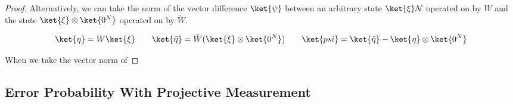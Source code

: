 \begin{proof}

Alternatively, we can take the norm of the vector difference $\ket{\psi}$
between an
arbitrary state $\ket{\xi} \mathcal{N}$ operated on by $W$ and the
state $\ket{\xi} \otimes \ket{0^N}$ operated on by $\tilde{W}$.

\begin{equation}
\ket{\eta} = W\ket{\xi} \qquad
\ket{\tilde{\eta}} = \tilde{W}(\ket{\xi} \otimes \ket{0^N}) \qquad
\ket{psi} = \ket{\tilde{\eta}} - \ket{\eta} \otimes \ket{0^N}
\end{equation}

When we take the vector norm of

\end{proof}

\subsection{Error Probability With Projective Measurement}
\label{subsec:error-proj}
